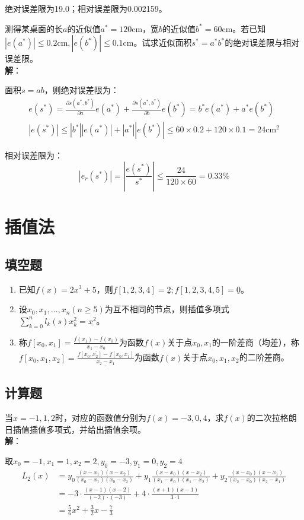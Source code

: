 \documentclass[UTF8,a4paper,11pt,oneside]{ctexbook}
\begin{document}
绝对误差限为19.0；相对误差限为0.002159。

\vspace{4em}
测得某桌面的长\(a\)的近似值\(a^*=120\mathrm{cm}\)，宽\(b\)的近似值\(b^*=60\mathrm{cm}\)。若已知\(|e(a^*)|\leq0.2\mathrm{cm},|e(b^*)|\leq0.1\mathrm{cm}\)。试求近似面积\(s^*=a^*b^*\)的绝对误差限与相对误差限。\\
\textbf{解}：

面积\(s=ab\)，则绝对误差限为：
\begin{gather*}
    e(s^*)=\frac{\partial s(a^*,b^*)}{\partial a}e(a^*)+\frac{\partial s(a^*,b^*)}{\partial b}e(b^*)=b^*e(a^*)+a^*e(b^*)\\
    |e(s^*)|\leq|b^*||e(a^*)|+|a^*||e(b^*)|\leq60\times0.2+120\times0.1=24\mathrm{cm}^2
\end{gather*}

相对误差限为：
\[
|e_r(s^*)|=\left|\frac{e(s^*)}{s^*}\right|\leq\frac{24}{120\times60}=0.33\%
\]

\chapter{插值法}

\section{填空题}
\begin{enumerate}
    \item 已知\(f(x)=2x^3+5\)，则\(f[1,2,3,4]=\underline{2};f[1,2,3,4,5]=\underline{0}\)。
    \item 设\(x_0,x_1,\ldots,x_n(n\geq5)\)为互不相同的节点，则插值多项式\(\sum\limits_{k=0}^nl_k(s)x_k^2=\underline{x^2}\)。
    \item 称\(f[x_0,x_1]=\underline{\frac{f(x_1)-f(x_0)}{x_1-x_0}}\)为函数\(f(x)\)关于点\(x_0,x_1\)的一阶差商（均差），称\(f[x_0,x_1,x_2]=\underline{\frac{f[x_0,x_2]-f[x_0,x_1]}{x_2-x_1}}\)为函数\(f(x)\)关于点\(x_0,x_1,x_2\)的二阶差商。
\end{enumerate}

\section{计算题}

当\(x=-1,1,2\)时，对应的函数值分别为\(f(x)=-3,0,4\)，求\(f(x)\)的二次拉格朗日插值插值多项式，并给出插值余项。\\
\textbf{解}：

取\(x_0=-1,x_1=1,x_2=2,y_0=-3,y_1=0,y_2=4\)
\begin{align*}
    L_2(x) & =y_0\frac{(x-x_1)(x-x_2)}{(x_0-x_1)(x_0-x_2)}+y_1\frac{(x-x_0)(x-x_2)}{(x_1-x_0)(x_1-x_2)}+y_2\frac{(x-x_0)(x-x_1)}{(x_2-x_0)(x_2-x_1)}\\
    & =-3\cdot\frac{(x-1)(x-2)}{(-2)\cdot(-3)}+4\cdot\frac{(x+1)(x-1)}{3\cdot1}\\
    & =\frac{5}{6}x^2+\frac{3}{2}x-\frac{7}{3}
\end{align*}
\end{document}
